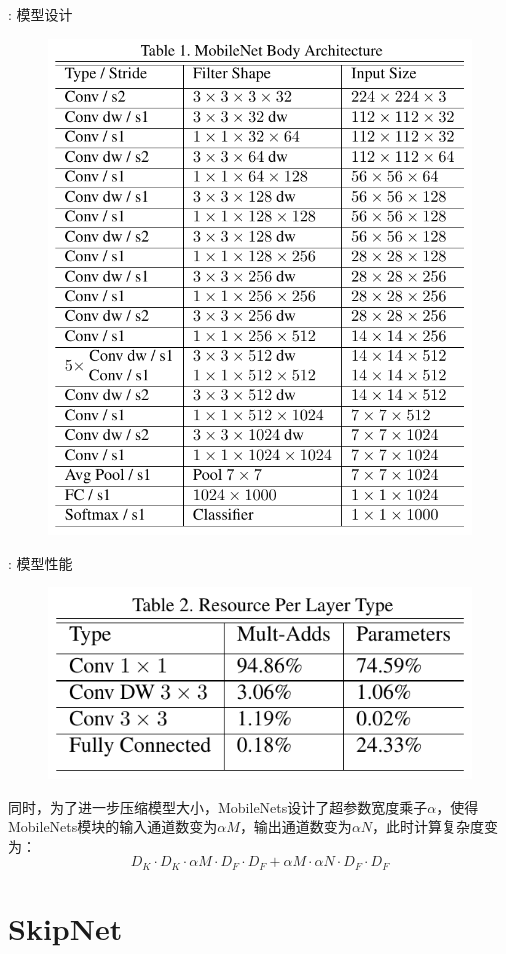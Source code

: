 \documentclass[UTF8, fontset=founder, aspectratio=43, 10pt, t]{ctexbeamer}
\begin{document}
\begin{frame}{\titleprefix: 模型设计}
	\begin{figure}
		\centering
		\includegraphics[width=0.5\linewidth]{Images/mobilenet}
		\label{fig:mobilenet}
	\end{figure}
\end{frame}

\begin{frame}{\titleprefix: 模型性能}
	\begin{figure}
		\centering
		\includegraphics[width=0.7\linewidth]{Images/mobilenetres}
		\label{fig:mobilenetres}
	\end{figure}

	同时，为了进一步压缩模型大小，MobileNets设计了超参数\alert{宽度乘子}$\alpha$，使得MobileNets模块的输入通道数变为$\alpha M$，输出通道数变为$\alpha N$，此时计算复杂度变为：
	$$
	D_{K} \cdot D_{K} \cdot \alpha M \cdot D_{F} \cdot D_{F}+\alpha M \cdot \alpha N \cdot D_{F} \cdot D_{F}
	$$
	
\end{frame}

\section{SkipNet}
\end{document}
